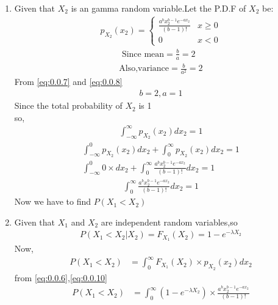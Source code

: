 \documentclass[journal,12pt,twocolumn]{IEEEtran}
\begin{document}
\begin{enumerate}
    \item Given that $X_2$ is an gamma random variable.Let the P.D.F of $X_2$ be:
    \begin{align}
        p_{X_2}(x_2)=
        \begin{cases}
            \frac{a^b x_2^{b-1}e^{-ax_2}}{(b-1)!} & x\geq 0\\
            0 & x<0
        \end{cases}\label{eq:0.0.6}
    \end{align}
    \begin{align}
       \text{ Since mean}=\frac{b}{a}=2\label{eq:0.0.7}\\
         \text{Also,variance}=\frac{b}{a^2}=2\label{eq:0.0.8}
    \end{align}
  From \eqref{eq:0.0.7} and \eqref{eq:0.0.8}
  \begin{align}
      b=2,a=1\label{eq:0.0.9}
  \end{align}
  Since the total probability of $X_2$ is 1 \\
  so,\begin{align}
      \int_{-\infty}^\infty p_{X_2}(x_2) dx_2=1
      \end{align}
      \begin{align}
      \int_{-\infty} ^0 p_{X_2}(x_2)
     dx_2+\int_{0}^\infty p_{X_2}(x_2) dx_2=1\\
      \int_{-\infty} ^0 0\times dx_2+\int_{0}^\infty \frac{a^b x_2^{b-1}e^{-ax_2}}{(b-1)!} dx_2=1
      \end{align}
      \begin{align}
      \int_{0}^\infty \frac{a^b x_2^{b-1}e^{-ax_2}}{(b-1)!} dx_2=1\label{eq:0.0.13}
  \end{align}
  Now we have to find $P(X_1<X_2)$\\
  \item Given that $X_1$ and $X_2$ are independent random variables,so
  \begin{align}
     P(X_1<X_2|X_2)=F_{X_1}(X_2)=1-e^{-\lambda X_2}\label{eq:0.0.10}
  \end{align}
  Now,
\begin{align}
      P(X_1<X_2)&=\int_{0}^\infty F_{X_1}(X_2) \times p_{X_2}(x_2)dx_2
      \end{align}
      from \eqref{eq:0.0.6},\eqref{eq:0.0.10}
  \begin{align}
     P(X_1<X_2)&=\int_{0}^\infty (1-e^{-\lambda X_2})\times \frac{a^b x_2^{b-1}e^{-ax_2}}{(b-1)!}
     \end{align}
     \begin{align}

\end{align}
\end{enumerate}
\end{document}

